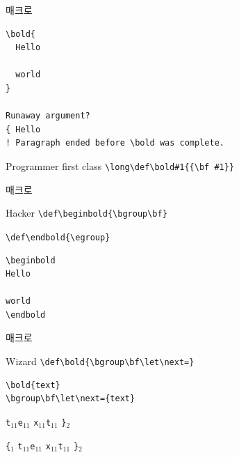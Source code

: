 \documentclass{beamer}
\begin{document}
%
\begin{frame}[fragile]{\texttt{\string\bold} 매크로}
  \begin{Verbatim}[fontsize=\small, formatcom=\color{blue}]
\bold{
  Hello

  world
}

Runaway argument?
{ Hello
! Paragraph ended before \bold was complete.
  \end{Verbatim}
  \begin{alertblock}{Programmer first class}
    \verb+\long\def\bold#1{{\bf #1}}+
  \end{alertblock}
\end{frame}


%
\begin{frame}[fragile]{\texttt{\string\bold} 매크로}
  \begin{alertblock}{Hacker}
    \verb+\def\beginbold{\bgroup\bf}+
    
    \verb+\def\endbold{\egroup}+
  \end{alertblock}

  \begin{Verbatim}[fontsize=\small, formatcom=\color{blue}]
\beginbold
Hello

world
\endbold
  \end{Verbatim}
\end{frame}


%
\begin{frame}[fragile]{\texttt{\string\bold} 매크로}
  \begin{alertblock}{Wizard}
    \verb+\def\bold{\bgroup\bf\let\next=}+
  \end{alertblock}

  \begin{Verbatim}[fontsize=\small, formatcom=\color{blue}]
\bold{text}
\bgroup\bf\let\next={text}
  \end{Verbatim}


  \bigskip

  \quad{}\quad
  \verb|t|$_{11}$\quad\verb|e|$_{11}$\quad
  \verb|x|$_{11}$\quad\verb|t|$_{11}$\quad
  \verb|}|$_{2}$

  \verb|{|$_1$\quad{}\quad
  \verb|t|$_{11}$\quad\verb|e|$_{11}$\quad
  \verb|x|$_{11}$\quad\verb|t|$_{11}$\quad
  \verb|}|$_{2}$
\end{frame}
\end{document}
